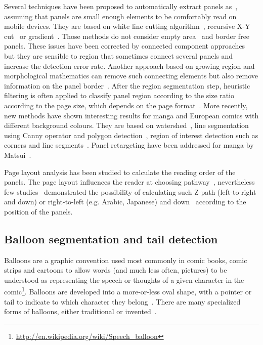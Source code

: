 Several techniques have been proposed to automatically extract panels as~\cite{In11}, assuming that panels are small enough elements to be comfortably read on mobile devices.
They are based on white line cutting algorithm~\cite{Duda72,Luyuan2014Automatic,Chan2007Automatic}, recursive X-Y cut~\cite{Han07} or gradient~\cite{Tan07}.
Those methods do not consider empty area~\cite{In11} and border free panels.
These issues have been corrected by connected component approaches~\cite{Arai10} 
but they are sensible to region that sometimes connect several panels and increase the detection error rate.
Another approach based on growing region and morphological mathematics can remove such connecting elements but also remove information on the panel border~\cite{Ho2012}.
After the region segmentation step, heuristic filtering is often applied to classify panel region according to the size ratio according to the page size, which depends on the page format~\cite{Arai11,Ho2012}.
More recently, new methods have shown interesting results for manga and European comics with different background colours.
They are based on watershed~\cite{ponsard2012ocr}, line segmentation using Canny operator and polygon detection~\cite{Luyuan2014Automatic}, region of interest detection such as corners and line segments~\cite{stommel2012segmentation,Tsai2013Adaptive}.
Panel retargeting have been addressed for manga by Matsui~\cite{Matsui2011}.

Page layout analysis has been studied to calculate the reading order of the panels.
The page layout influences the reader at choosing pathway~\cite{Cohn_2013}, nevertheless few studies~\cite{Guerin2012Ontologies,Ponsard09,Arai2010Automatic} demonstrated the possibility of calculating such Z-path (left-to-right and down) or right-to-left (e.g. Arabic, Japanese) and down~\cite{Li2013Comic,Tsai2013Adaptive} according to the position of the panels. 

\subsection{Balloon segmentation and tail detection}
\label{sec:sota:balloon_segmentation}

Balloons are a graphic convention used most commonly in comic books, comic strips and cartoons to allow words (and much less often, pictures) to be understood as representing the speech or thoughts of a given character in the comic\footnote{\url{http://en.wikipedia.org/wiki/Speech_balloon}}.
Balloons are developed into a more-or-less oval shape, with a pointer or tail to indicate to which character they belong~\cite{Goggin2010Rise,Varnum2007Language}.
There are many specialized forms of balloons, either traditional or invented~\cite{Marx2006Writing}.


